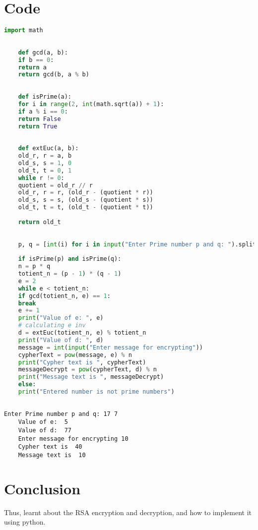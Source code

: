 \documentclass{article}
\begin{document}
\section{\textbf{Code}}
\begin{lstlisting}[language=python, caption={Input}]
	import math
	
	
	def gcd(a, b):
	if b == 0:
	return a
	return gcd(b, a % b)
	
	
	def isPrime(a):
	for i in range(2, int(math.sqrt(a)) + 1):
	if a % i == 0:
	return False
	return True
	
	
	def extEuc(a, b):
	old_r, r = a, b
	old_s, s = 1, 0
	old_t, t = 0, 1
	while r != 0:
	quotient = old_r // r
	old_r, r = r, (old_r - (quotient * r))
	old_s, s = s, (old_s - (quotient * s))
	old_t, t = t, (old_t - (quotient * t))
	
	return old_t
	
	
	p, q = [int(i) for i in input("Enter Prime number p and q: ").split(" ")]
	
	if isPrime(p) and isPrime(q):
	n = p * q
	totient_n = (p - 1) * (q - 1)
	e = 2
	while e < totient_n:
	if gcd(totient_n, e) == 1:
	break
	e += 1
	print("Value of e: ", e)
	# calculating e inv
	d = extEuc(totient_n, e) % totient_n
	print("Value of d: ", d)
	message = int(input("Enter message for encrypting"))
	cypherText = pow(message, e) % n
	print("Cypher text is ", cypherText)
	messageDecrypt = pow(cypherText, d) % n
	print("Message text is ", messageDecrypt)
	else:
	print("Entered number is not prime numbers")
	
\end{lstlisting}
\begin{lstlisting}[caption={Output}]
	Enter Prime number p and q: 17 7
	Value of e:  5
	Value of d:  77
	Enter message for encrypting 10
	Cypher text is  40
	Message text is  10
\end{lstlisting}
\section{\textbf{Conclusion}}
Thus, learnt about the RSA encryption and decryption, and how to implement it using python.
\end{document}

